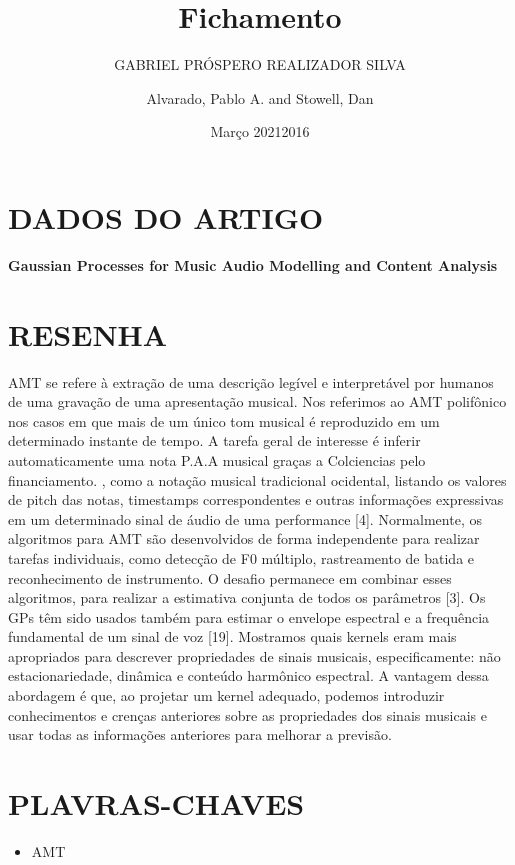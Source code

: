 \documentclass{article}
\title{Fichamento}
\author{GABRIEL PRÓSPERO REALIZADOR  SILVA}
\date{Março 2021}
\begin{document}
\maketitle

\section{DADOS DO ARTIGO}
\textbf{Gaussian Processes for Music Audio Modelling and Content Analysis \\}
\author{Alvarado, Pablo A. and Stowell, Dan \\}
\date{2016}

\section{RESENHA}
AMT se refere à extração de uma descrição legível e interpretável por humanos de uma gravação de uma apresentação musical. Nos referimos ao AMT polifônico nos casos em que mais de um único tom musical é reproduzido em um determinado instante de tempo.
A tarefa geral de interesse é inferir automaticamente uma nota P.A.A musical graças a Colciencias pelo financiamento. , como a notação musical tradicional ocidental, listando os valores de pitch das notas, timestamps correspondentes e outras informações expressivas em um determinado sinal de áudio de uma performance [4]. 
Normalmente, os algoritmos para AMT são desenvolvidos de forma independente para realizar tarefas individuais, como detecção de F0 múltiplo, rastreamento de batida e reconhecimento de instrumento. O desafio permanece em combinar esses algoritmos, para realizar a estimativa conjunta de todos os parâmetros [3].
Os GPs têm sido usados ​​também para estimar o envelope espectral e a frequência fundamental de um sinal de voz [19].
Mostramos quais kernels eram mais apropriados para descrever propriedades de sinais musicais, especificamente: não estacionariedade, dinâmica e conteúdo harmônico espectral. A vantagem dessa abordagem é que, ao projetar um kernel adequado, podemos introduzir conhecimentos e crenças anteriores sobre as propriedades dos sinais musicais e usar todas as informações anteriores para melhorar a previsão.
\section{PLAVRAS-CHAVES}
\begin{itemize}
    \item AMT
\end{itemize}
\end{document}
